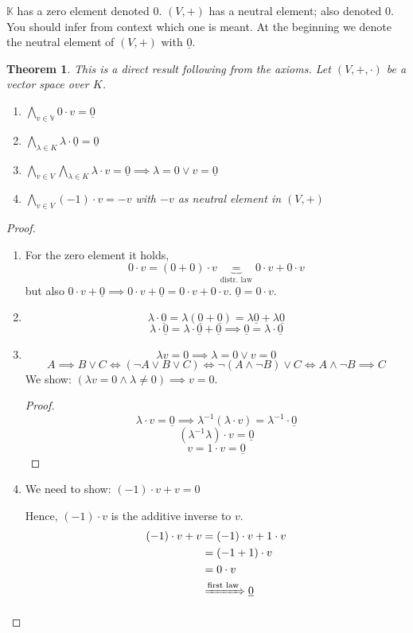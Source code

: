 \documentclass[a4paper,landscape,twocolumn]{article}
\newtheorem{theorem}{Theorem}[section]
\begin{document}
$\mathbb K$ has a zero element denoted $0$.
$(V, +)$ has a neutral element; also denoted $0$.
You should infer from context which one is meant.
At the beginning we denote the neutral element of $(V, +)$ with $\underline{0}$.

\begin{theorem}
  \label{thm:axiom-cor}
  This is a direct result following from the axioms.
  Let $(V, +, \cdot)$ be a vector space over $K$.
  \begin{enumerate}
    \item $\bigwedge_{v \in \mathbb V} 0 \cdot v = \underline{0}$
    \item $\bigwedge_{\lambda \in K} \lambda \cdot \underline{0} = \underline{0}$
    \item $\bigwedge_{v \in V} \bigwedge_{\lambda \in K} \lambda \cdot v = \underline{0} \implies \lambda = 0 \lor v = \underline{0}$
    \item $\bigwedge_{v \in V} (-1) \cdot v = -v$ with $-v$ as neutral element in $(V, +)$
  \end{enumerate}
\end{theorem}

\begin{proof}
  \begin{enumerate}
    \item For the zero element it holds,
      \[ 0 \cdot v = (0 + 0) \cdot v \underbrace{=}_{\text{distr. law}} 0 \cdot v + 0 \cdot v \]
      but also $0 \cdot v + \underline{0} \implies 0 \cdot v + \underline{0} = 0\cdot v + 0\cdot v$.
      $\underline{0} = 0\cdot v$.
    \item
      \[ \lambda \cdot \underline{0} = \lambda (\underline{0} + \underline{0}) = \lambda \underline{0} + \lambda \underline{0} \]
      \[ \lambda \cdot \underline{0} = \lambda \cdot \underline{0} + \underline{0} \implies \underline{0} = \lambda \cdot \underline{0} \]
    \item
      \[ \lambda v = 0 \implies \lambda = 0 \lor v = 0 \]
      \[
          A \implies B \lor C \iff (\neg A \lor B \lor C)
          \iff \neg(A \land \neg B) \lor C
          \iff A \land \neg B \implies C
      \]
      We show: $(\lambda v = 0 \land \lambda \neq 0) \implies v = 0$.
      \begin{proof}
        \[ \lambda \cdot v = \underline{0} \implies \lambda^{-1}(\lambda \cdot v) = \lambda^{-1} \cdot \underline{0} \]
        \[ (\lambda^{-1} \lambda) \cdot v = \underline{0} \]
        \[ v = 1 \cdot v = \underline{0} \]
      \end{proof}
    \item We need to show: $(-1) \cdot v + v = 0$

      Hence, $(-1)\cdot v$ is the additive inverse to $v$.
      \begin{align*}
        (-1) \cdot v + v &= (-1) \cdot v + 1 \cdot v \\
            &= (-1 + 1) \cdot v \\
            &= 0 \cdot v \\
            &\xRightarrow{\text{first law}} \underline{0}
      \end{align*}
  \end{enumerate}
\end{proof}
\end{document}
